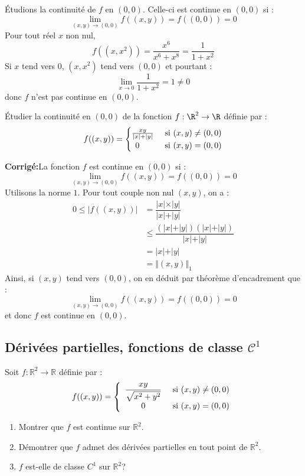 \documentclass[a4paper,twoside,french,11pt]{VcCours}
\newcommand{\corr}{\textbf{Corrigé:}}
\begin{document}
Étudions la continuité de $f$ en $(0,0)$. Celle-ci est continue en $(0,0)$ si :
$$ \lim_{(x,y) \rightarrow (0,0)} f((x,y)) =f((0,0))= 0$$
Pour tout réel $x$ non nul,
$$ f((x,x^2)) = \dfrac{x^6}{x^6+x^8} = \dfrac{1}{1+x^2}$$
Si $x$ tend vers $0$, $(x,x^2)$ tend vers $(0,0)$ et pourtant :
$$ \lim_{x \rightarrow 0} \dfrac{1}{1+x^2} = 1 \neq 0$$
donc $f$ n'est pas continue en $(0,0)$.

\begin{Exercice}{} Étudier la continuité en $(0,0)$ de la fonction $f : \R^{2} \rightarrow \R$ définie par :
  \[
  f((x,y)) =
  \begin{cases}
    \frac{xy}{\vert x \vert + \vert y \vert} & \hbox{ si } (x,y) \neq (0,0) \\
    \, \; 0 & \hbox{ si } (x,y)=(0,0)
  \end{cases}
  \]
\end{Exercice}

\corr La fonction $f$ est continue en $(0,0)$ si :
$$ \lim_{(x,y) \rightarrow (0,0)} f((x,y)) =f((0,0))= 0$$
Utilisons la norme $1$. Pour tout couple non nul $(x,y)$, on a :
\begin{align*}
0 \leq \vert f((x,y)) \vert & = \dfrac{\vert x \vert \times \vert y \vert}{\vert x \vert + \vert y \vert} \\
& \leq \dfrac{(\vert x \vert + \vert y \vert)(\vert x \vert + \vert y \vert)}{\vert x \vert + \vert y \vert} \\
& = \vert x \vert + \vert y \vert \\
& = \Vert (x,y) \Vert_1
\end{align*}
Ainsi, si $(x,y)$ tend vers $(0,0)$, on en déduit par théorème d'encadrement que :
$$  \lim_{(x,y) \rightarrow (0,0)} f((x,y)) =f((0,0))= 0$$
et donc $f$ est continue en $(0,0)$.


\subsection{Dérivées partielles, fonctions de classe \texorpdfstring{$\mathcal{C}^1$}{C¹}}


\begin{Exercice}{} Soit $f : \mathbb{R}^2 \rightarrow \mathbb{R}$ définie par :
$$ f((x,y)) = \left\lbrace \begin{array}{cl}
\dfrac{xy}{\sqrt{x^{2}+y^{2}}} & \hbox{ si } (x,y) \neq (0,0) \\
0 & \hbox{ si } (x,y) = (0,0)\\
\end{array}\right.$$

\begin{enumerate}
\item Montrer que $f$ est continue sur $\mathbb{R}^{2}$.
\item Démontrer que $f$ admet des d\'{e}riv\'{e}es partielles en tout point de $\mathbb{R}^{2}$.
\item $f$ est-elle de classe $C^{1}$ sur $\mathbb{R}^2$?
\end{enumerate}
\end{Exercice}
\end{document}
